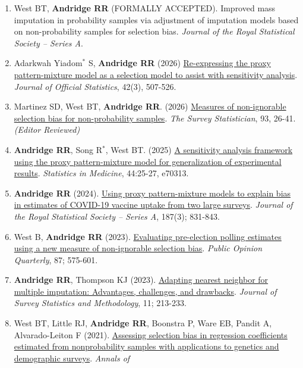\documentclass[
  english,
  letterpaper,
  DIV=11,
  numbers=noendperiod]{scrartcl}
\providecommand{\tightlist}{%
  \setlength{\itemsep}{0pt}\setlength{\parskip}{0pt}}
\begin{document}
\begin{enumerate}
\def\labelenumi{\arabic{enumi}.}
\tightlist
\item
  West BT, \textbf{Andridge RR} (FORMALLY ACCEPTED). Improved mass
  imputation in probability samples via adjustment of imputation models
  based on non-probability samples for selection bias. \emph{Journal of
  the Royal Statistical Society -- Series A}.
\item
  Adarkwah Yiadom\(^*\) S, \textbf{Andridge RR} (2026)
  \href{https://journals.sagepub.com/doi/10.1177/0282423X261457501}{Re-expressing
  the proxy pattern-mixture model as a selection model to assist with
  sensitivity analysis}. \emph{Journal of Official Statistics}, 42(3),
  507-526.
\item
  Martinez SD, West BT, \textbf{Andridge RR}. (2026)
  \href{https://isi-iass.org/home/wp-content/uploads/Survey_Statistician_2026_January_N93_05.pdf}{Measures
  of non-ignorable selection bias for non-probability samples}.
  \emph{The Survey Statistician}, 93, 26-41. \emph{(Editor Reviewed)}
\item
  \textbf{Andridge RR}, Song R\(^*\), West BT. (2025)
  \href{https://doi.org/10.1002/sim.70313}{A sensitivity analysis
  framework using the proxy pattern-mixture model for generalization of
  experimental results}. \emph{Statistics in Medicine}, 44:25-27,
  e70313.
\item
  \textbf{Andridge RR} (2024).
  \href{https://doi.org/10.1093/jrsssa/qnae005}{Using proxy
  pattern-mixture models to explain bias in estimates of COVID-19
  vaccine uptake from two large surveys}. \emph{Journal of the Royal
  Statistical Society -- Series A}, 187(3); 831-843.
\item
  West B, \textbf{Andridge RR} (2023).
  \href{https://doi.org/10.1093/poq/nfad018}{Evaluating pre-election
  polling estimates using a new measure of non-ignorable selection
  bias}. \emph{Public Opinion Quarterly}, 87; 575-601.
\item
  \textbf{Andridge RR}, Thompson KJ (2023).
  \href{https://doi.org/10.1093/jssam/smab058}{Adapting nearest neighbor
  for multiple imputation: Advantages, challenges, and drawbacks}.
  \emph{Journal of Survey Statistics and Methodology}, 11; 213-233.
\item
  West BT, Little RJ, \textbf{Andridge RR}, Boonstra P, Ware EB, Pandit
  A, Alvarado-Leiton F (2021).
  \href{https://doi.org/10.1214/21-AOAS1453}{Assessing selection bias in
  regression coefficients estimated from nonprobability samples with
  applications to genetics and demographic surveys}. \emph{Annals of
}
\end{enumerate}
\end{document}
